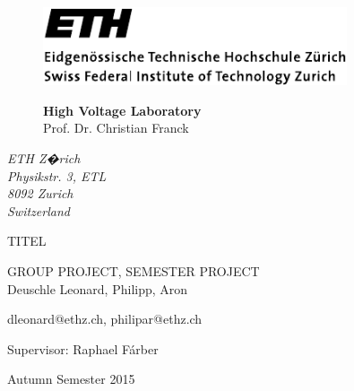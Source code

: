


\pagestyle{empty}

\begin{figure}
    \begin{minipage}[b]{0.5\linewidth}
        \includegraphics[width=0.8\textwidth]{figures/ethlogo}
    \end{minipage}
    \hfill
    \begin{minipage}[b]{0.45\linewidth}
        \flushright
        \textbf{High Voltage Laboratory}\\
        \vspace{3mm}
        Prof. Dr. Christian Franck
    \end{minipage}
\end{figure}


\begin{flushright}
    \textit{ETH Z�rich\\
    Physikstr. 3, ETL\\
    8092 Zurich\\
    Switzerland}
\end{flushright}

\phantom{u}
\vspace{1.5cm}
\Huge{\sc TITEL}
\vspace{1.5cm}

\Large
GROUP PROJECT, SEMESTER PROJECT\\

\vspace*{5cm} \large
Deuschle Leonard, Philipp, Aron

dleonard@ethz.ch, philipar@ethz.ch

\normalsize

\vspace{1.5cm}

Supervisor: Raphael F\'arber

Autumn Semester 2015